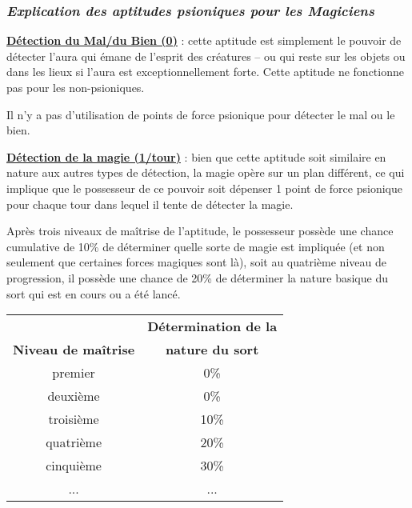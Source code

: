 \subsubsection*{\textit{Explication des aptitudes psioniques pour les Magiciens}}

\label{magicien-detection-mal}\textbf{\uline{Détection du Mal/du Bien (0)}} : cette aptitude est simplement le pouvoir de détecter l'aura qui émane de l'esprit des créatures -- ou qui reste sur les objets ou dans les lieux si l'aura est exceptionnellement forte. Cette aptitude ne fonctionne pas pour les non-psioniques.

\bigskip

Il n'y a pas d'utilisation de points de force psionique pour détecter le mal ou le bien.

\bigskip

\label{magicien-magie}\textbf{\uline{Détection de la magie (1/tour)}} : bien que cette aptitude soit similaire en nature aux autres types de détection, la magie opère sur un plan différent, ce qui implique que le possesseur de ce pouvoir soit dépenser 1 point de force psionique pour chaque tour dans lequel il tente de détecter la magie.

\bigskip

Après trois niveaux de maîtrise de l'aptitude, le possesseur possède une chance cumulative de 10\% de déterminer quelle sorte de magie est impliquée (et non seulement que certaines forces magiques sont là), soit au quatrième niveau de progression, il possède une chance de 20\% de déterminer la nature basique du sort qui est en cours ou a été lancé.

\bigskip

\begin{tabular}{cc}
                            &\textbf{Détermination de la} \\
\textbf{Niveau de maîtrise} & \textbf{nature du sort} \\
premier     & 0\%   \\
deuxième    & 0\%   \\
troisième   & 10\%  \\
quatrième   & 20\%  \\
cinquième   & 30\%  \\
...         & ...    \\
\end{tabular}

